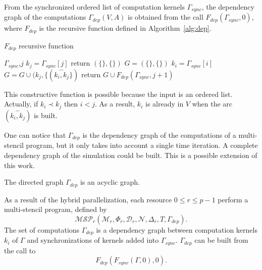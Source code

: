 \begin{mydef}
From the synchronized ordered list of computation kernels $\Gamma_{sync}$, the dependency graph of the computations $\Gamma_{dep}(V,A)$ is obtained from the call $F_{dep}(\Gamma_{sync},0)$, where $F_{dep}$ is the recursive function defined in Algorithm~\ref{alg:dep}.
\end{mydef}

\begin{algorithm}
\caption{$F_{dep}$ recursive function}
\label{alg:dep}
\begin{algorithmic}[1]
 {$\Gamma_{sync}$,$j$}
\State $k_j = \Gamma_{sync}[j]$
\State return $(\{\},\{\})$
\State $G=(\{\},\{\})$
\State $k_i = \Gamma_{sync}[i]$
\State $G = G \cup (k_j, \{(\overset{\frown}{k_i,k_j} \})$
\EndIf
\EndFor
\State return $G \cup F_{dep}(\Gamma_{sync},j+1)$
\EndIf
\EndProcedure
\end{algorithmic}
\end{algorithm}

This constructive function is possible because the input is an ordered list. Actually, if $k_i\prec k_j$ then $i<j$. As a result, $k_i$ is already in $V$ when the arc $(\overset{\frown}{k_i,k_j})$ is built.

One can notice that $\Gamma_{dep}$ is the dependency graph of the computations of a multi-stencil program, but it only takes into account a single time iteration. A complete dependency graph of the simulation could be built. This is a possible extension of this work.

\begin{myprop}
The directed graph $\Gamma_{dep}$ is an acyclic graph.
\end{myprop}

As a result of the hybrid parallelization, each resource $0 \leq r \leq p-1$ perform a multi-stencil program, defined by
\begin{equation*}
\mathcal{MSP}_r(\mathcal{M}_r,\Phi_r,\mathcal{D}_r,\mathcal{N},\Delta_r,T,\Gamma_{dep}).
\end{equation*}
The set of computations $\Gamma_{dep}$ is a dependency graph between computation kernels $k_i$ of $\Gamma$ and synchronizations of kernels added into $\Gamma_{sync}$. $\Gamma_{dep}$ can be built from the call to 
\begin{equation*}
F_{dep}(F_{sync}(\Gamma,0),0).
\end{equation*}

